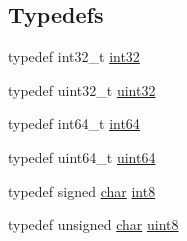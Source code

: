 \subsection*{Typedefs}
\begin{DoxyCompactItemize}
\item 
typedef int32\+\_\+t \hyperlink{namespaceGFLAGS__NAMESPACE_ab5e093ecf2996943821e773cdf22140a}{int32}
\item 
typedef uint32\+\_\+t \hyperlink{namespaceGFLAGS__NAMESPACE_a7cd152e31d8bd6ada6c1c79adeb5bd8c}{uint32}
\item 
typedef int64\+\_\+t \hyperlink{namespaceGFLAGS__NAMESPACE_aedc4fdd5cc24ffefc1a7d07a841e9798}{int64}
\item 
typedef uint64\+\_\+t \hyperlink{namespaceGFLAGS__NAMESPACE_af2914c2ad1f9bf454f663ddcc5c934d5}{uint64}
\item 
typedef signed \hyperlink{CMakeCache_8txt_afe71f11dacb15682cdc012f7208e6e09}{char} \hyperlink{namespaceGFLAGS__NAMESPACE_a47f05404a533fae9cc6f9bb0828f66eb}{int8}
\item 
typedef unsigned \hyperlink{CMakeCache_8txt_afe71f11dacb15682cdc012f7208e6e09}{char} \hyperlink{namespaceGFLAGS__NAMESPACE_a4e09db0919d554f04abd3787bbcb53b4}{uint8}
\end{DoxyCompactItemize}
